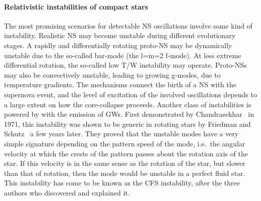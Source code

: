 \paragraph{Relativistic instabilities of compact stars} The most 
promising scenarios for detectable NS oscillations involve some 
kind of instability. Realistic NS may become unstable during 
different evolutionary stages. A rapidly and differentially rotating 
proto-NS may be dynamically unstable due to the so-called bar-mode 
(the l=m=2 f-mode). At less extreme differential rotation, the 
so-called low T/W instability may operate. Proto-NSs may also be 
convectively unstable, leading to growing g-modes, due to temperature 
gradients. The mechanisms connect the birth of a NS with the 
supernova event, and the level of excitation of the involved 
oscillations depends to a large extent on how the core-collapse 
proceeds. Another class of instabilities is powered by with the 
emission of GWs. First demonstrated by Chandrasekhar~\cite{ChandraCFS} 
in 1971, this instability was shown to be generic in rotating stars 
by  Friedman and Schutz~\cite{Friedman1978}  a few years later. They 
proved that the unstable modes have a very simple signature depending 
on the pattern speed of the mode, i.e.\ the angular velocity at which 
the crests of the pattern passes about the rotation axis of the star. 
If this velocity is in the same sense as the rotation of the star, 
but slower than that of rotation, then the mode would be unstable in 
a perfect fluid star. This instability has come to be known as the 
CFS instability, after the three authors who discovered and explained 
it.  

